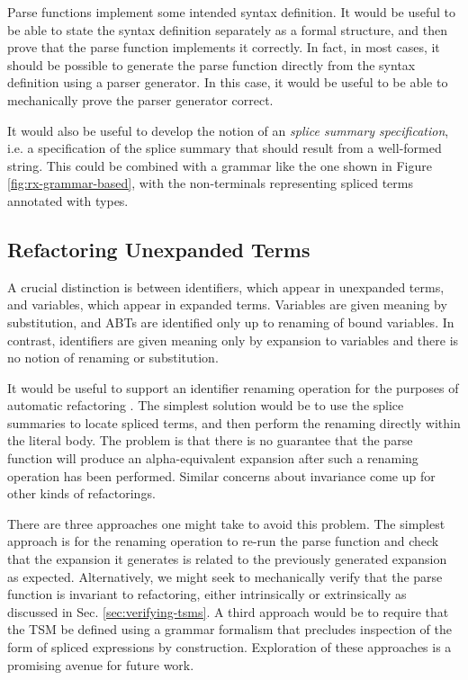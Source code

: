 Parse functions implement some intended syntax definition. It would be useful to be able to state the syntax definition separately as a formal structure, and then prove that the parse function implements it correctly. In fact, in most cases, it should be possible to generate the parse function directly from the syntax definition using a parser generator. In this case, it would be useful to be able to mechanically prove the parser generator correct.

It would also be useful to develop the notion of an \emph{splice summary specification}, i.e. a specification of the splice summary that should result from a well-formed string. This could be combined with a grammar like the one shown in Figure \ref{fig:rx-grammar-based}, with the non-terminals representing spliced terms annotated with types.

\subsection{Refactoring Unexpanded Terms}\label{sec:refactoring}
A crucial distinction is between identifiers, which appear in unexpanded terms, and variables, which appear in expanded terms. Variables are given meaning by substitution, and ABTs are identified only up to renaming of bound variables. In contrast, identifiers are given meaning only by expansion to variables and there is no notion of renaming or substitution.

It would be useful to support an identifier renaming operation for the purposes of automatic refactoring \cite{mens2004survey}. The simplest solution would be to use the splice summaries to locate spliced terms, and then perform the renaming directly within the literal body. The problem is that there is no guarantee that the parse function will produce an alpha-equivalent expansion after such a renaming operation has been performed. Similar concerns about invariance come up for other kinds of refactorings.

There are three approaches one might take to avoid this problem. The simplest approach is for the renaming operation to re-run the parse function and check that the expansion it generates is related to the previously generated expansion as expected. Alternatively, we might seek to mechanically verify that the parse function is invariant to refactoring, either intrinsically or extrinsically as discussed in Sec. \ref{sec:verifying-tsms}. 
A third approach would be to require that the TSM be defined using a grammar formalism that precludes inspection of the form of spliced expressions by construction. Exploration of these approaches is a promising avenue for future work.

